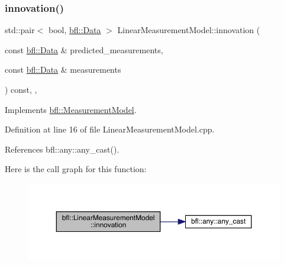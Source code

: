\mbox{\label{classbfl_1_1LinearMeasurementModel_a12485b4b6d511e97e338a4db6861b277}} 
\subsubsection{\texorpdfstring{innovation()}{innovation()}}
{\footnotesize\ttfamily std\+::pair$<$ bool, \mbox{\hyperlink{namespacebfl_af6b103c6821db1b54452f776fdd9dd02}{bfl\+::\+Data}} $>$ Linear\+Measurement\+Model\+::innovation (\begin{DoxyParamCaption}\item[{const \mbox{\hyperlink{namespacebfl_af6b103c6821db1b54452f776fdd9dd02}{bfl\+::\+Data}} \&}]{predicted\+\_\+measurements,  }\item[{const \mbox{\hyperlink{namespacebfl_af6b103c6821db1b54452f776fdd9dd02}{bfl\+::\+Data}} \&}]{measurements }\end{DoxyParamCaption}) const\hspace{0.3cm}{\ttfamily [override]}, {\ttfamily [virtual]}, {\ttfamily [inherited]}}



Implements \mbox{\hyperlink{classbfl_1_1MeasurementModel_aa06e0643805551a981bcc013ad44c829}{bfl\+::\+Measurement\+Model}}.



Definition at line 16 of file Linear\+Measurement\+Model.\+cpp.



References bfl\+::any\+::any\+\_\+cast().

Here is the call graph for this function\+:
\nopagebreak
\begin{figure}[H]
\begin{center}
\leavevmode
\includegraphics[width=350pt]{classbfl_1_1LinearMeasurementModel_a12485b4b6d511e97e338a4db6861b277_cgraph}
\end{center}
\end{figure}
\mbox{\label{classbfl_1_1Logger_ad44f46593cb8c4c87c1178eb326e2f64}} 
